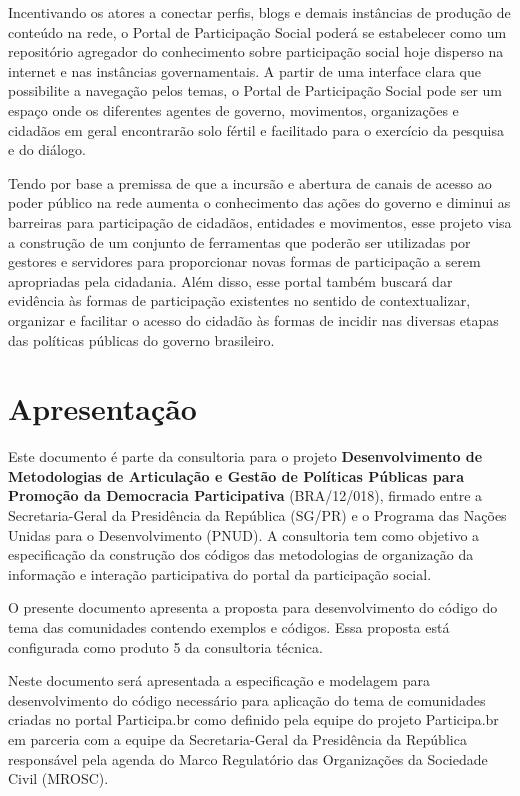 \documentclass[[a4paper,11pt]{article}
\begin{document}
Incentivando os atores a conectar perfis, blogs e demais instâncias de
produção
de conteúdo na rede, o Portal de Participação Social poderá se
estabelecer como um
repositório agregador do conhecimento sobre participação social hoje
disperso na
internet e nas instâncias governamentais. A partir de uma interface
clara que possibilite
a navegação pelos temas, o Portal de Participação Social pode ser um
espaço onde os
diferentes agentes de governo, movimentos, organizações e cidadãos em
geral
encontrarão solo fértil e facilitado para o exercício da pesquisa e do
diálogo.

Tendo por base a premissa de que a incursão e abertura de canais de
acesso ao
poder público na rede aumenta o conhecimento das ações do governo e
diminui as
barreiras para participação de cidadãos, entidades e movimentos, esse
projeto visa a
construção de um conjunto de ferramentas que poderão ser utilizadas por
gestores e
servidores para proporcionar novas formas de participação a serem
apropriadas pela
cidadania. Além disso, esse portal também buscará dar evidência às
formas de
participação existentes no sentido de contextualizar, organizar e
facilitar o acesso do
cidadão às formas de incidir nas diversas etapas das políticas públicas
do governo
brasileiro.

\section{Apresentação}

Este documento é parte da consultoria para o projeto
\textbf{Desenvolvimento de Metodologias de Articulação e Gestão de
Políticas Públicas para Promoção da Democracia Participativa}
(BRA/12/018), firmado entre a Secretaria-Geral da Presidência da República
(SG/PR) e o Programa das Nações Unidas para o Desenvolvimento (PNUD).
A consultoria tem como objetivo a especificação da construção dos códigos das
metodologias de organização da informação e interação participativa do
portal da participação social.

O presente documento apresenta a proposta para
desenvolvimento do código do tema das comunidades contendo exemplos e códigos.
Essa proposta está configurada como produto 5 da consultoria técnica.

Neste documento será apresentada a especificação e
modelagem para desenvolvimento do código necessário para aplicação do
tema de comunidades criadas no portal Participa.br como definido 
pela equipe do projeto Participa.br em parceria com a equipe da
Secretaria-Geral da Presidência da República responsável 
pela agenda do Marco Regulatório das Organizações da Sociedade Civil (MROSC).
\end{document}
